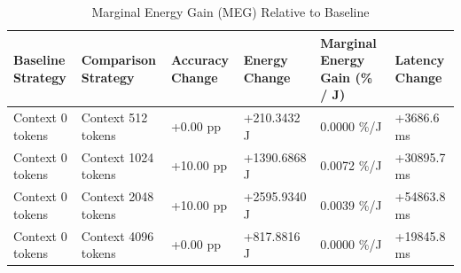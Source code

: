 \begin{table}
\caption{Marginal Energy Gain (MEG) Relative to Baseline}
\label{tab:marginal_energy_gain}
\begin{tabular}{llllll}
\toprule
Baseline Strategy & Comparison Strategy & Accuracy Change & Energy Change & Marginal Energy Gain (\% / J) & Latency Change \\
\midrule
Context 0 tokens & Context 512 tokens & +0.00 pp & +210.3432 J & 0.0000 \%/J & +3686.6 ms \\
Context 0 tokens & Context 1024 tokens & +10.00 pp & +1390.6868 J & 0.0072 \%/J & +30895.7 ms \\
Context 0 tokens & Context 2048 tokens & +10.00 pp & +2595.9340 J & 0.0039 \%/J & +54863.8 ms \\
Context 0 tokens & Context 4096 tokens & +0.00 pp & +817.8816 J & 0.0000 \%/J & +19845.8 ms \\
\bottomrule
\end{tabular}
\end{table}
